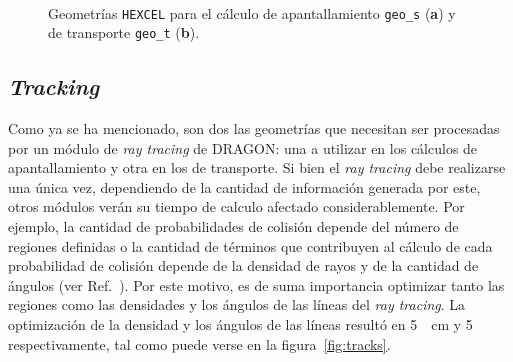 \documentclass[11pt]{article}
\begin{document}
\begin{figure}[!h]
 \begin{center}
  \\
  \caption{Geometrías \texttt{HEXCEL} para el cálculo de apantallamiento \texttt{geo_s} (\textbf{a}) y de transporte \texttt{geo_t} (\textbf{b}).}
  \label{fig:geos-excelt}
 \end{center}
\end{figure}


\subsection{\emph{Tracking}}

Como ya se ha mencionado, son dos las geometrías que necesitan ser procesadas por un módulo de \emph{ray tracing} de DRAGON: una a utilizar en los cálculos de apantallamiento y otra en los de transporte. Si bien el \emph{ray tracing} debe realizarse una única vez, dependiendo de la cantidad de información generada por este, otros módulos verán su tiempo de calculo afectado considerablemente. Por ejemplo, la cantidad de probabilidades de colisión depende del número de regiones definidas o la cantidad de términos que contribuyen al cálculo de cada probabilidad de colisión depende de la densidad de rayos y de la cantidad de ángulos (ver Ref.~\cite{handbook-ingnuclear}). Por este motivo, es de suma importancia optimizar tanto las regiones como las densidades y los ángulos de las líneas del \emph{ray tracing}. La optimización de la densidad y los ángulos de las líneas resultó en \SI{5}{\per\centi\metre} y \SI{5}{\angle} respectivamente, tal como puede verse en la figura~\ref{fig:tracks}.
\end{document}
